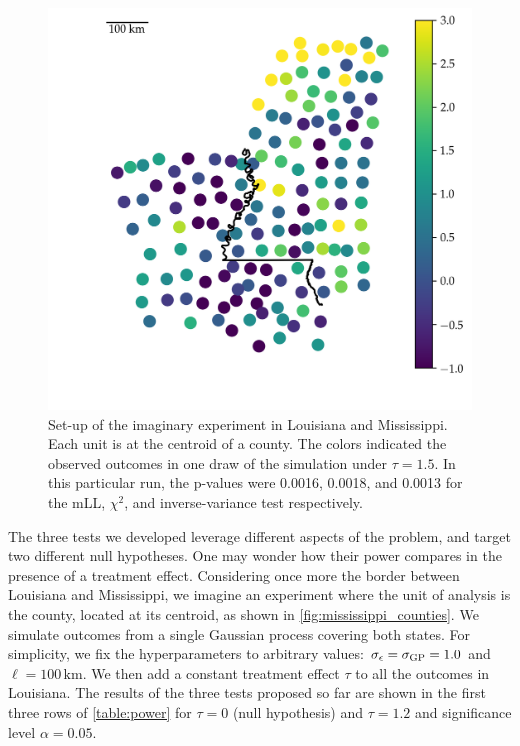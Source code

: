 \documentclass[letter,12pt]{article}
\begin{document}
\begin{figure}[tbp]
    \centering
    \includegraphics[height=0.4\textheight]{../figures/mississippi_sim.png}
    \caption{\label{fig:mississippi_counties}Set-up of the imaginary experiment in Louisiana and Mississippi. Each unit is at the centroid of a county. The colors indicated the observed outcomes in one draw of the simulation under \(\tau=1.5\). In this particular run, the p-values were 0.0016, 0.0018, and 0.0013 for the mLL, \(\chi^2\), and inverse-variance test respectively.}
\end{figure}

The three tests we developed leverage different aspects of the problem, and target two different null hypotheses. One may wonder how their power compares in the presence of a treatment effect. Considering once more the border between Louisiana and Mississippi, we imagine an experiment where the unit of analysis is the county, located at its centroid, as shown in \autoref{fig:mississippi_counties}.
We simulate outcomes from a single Gaussian process covering both states. For simplicity, we fix the hyperparameters to arbitrary values: \(\sigma_{\epsilon}=\sigma_{\mathrm{GP}}=1.0\) and \(\ell=100\,\mathrm{km}\).
We then add a constant treatment effect \(\tau\) to all the outcomes in Louisiana.
The results of the three tests proposed so far are shown in the first three rows of \autoref{table:power} for \(\tau=0\) (null hypothesis) and \(\tau=1.2\) and significance level \(\alpha=0.05\).
\end{document}

